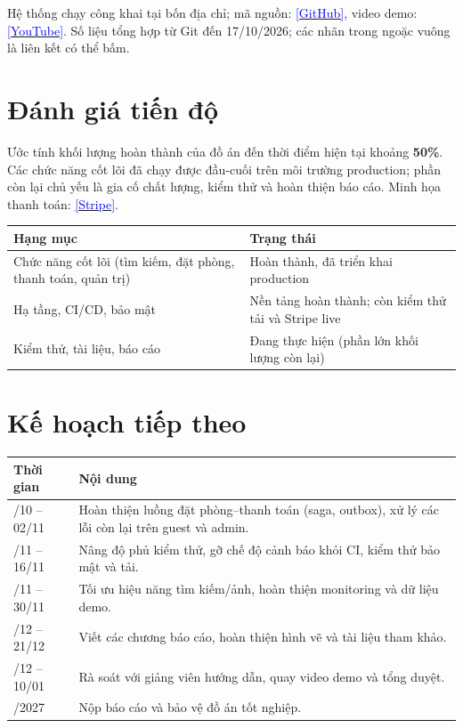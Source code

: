 \documentclass[12pt,a4paper]{article}
\newcommand{\gh}{https://github.com/bk-leducphuong/TravelNest-Hotel_Booking_System/blob/master}
\newcommand{\link}[2]{\href{#1}{\textcolor{blue}{\footnotesize[#2]}}}
\begin{document}
\noindent Hệ thống chạy công khai tại bốn địa chỉ; mã nguồn: \link{https://github.com/bk-leducphuong/TravelNest-Hotel_Booking_System}{GitHub}, video demo: \link{https://www.youtube.com/watch?v=-jxhmIJp988\&list=PLCt2C1YyUqcCfEhqOXE-Mul8UINudlCse}{YouTube}. Số liệu tổng hợp từ Git đến 17/10/2026; các nhãn trong ngoặc vuông là liên kết có thể bấm.

\section{Đánh giá tiến độ}

Ước tính khối lượng hoàn thành của đồ án đến thời điểm hiện tại khoảng \textbf{50\%}. Các chức năng cốt lõi đã chạy được đầu-cuối trên môi trường production; phần còn lại chủ yếu là gia cố chất lượng, kiểm thử và hoàn thiện báo cáo. Minh họa thanh toán: \link{\gh/docs/reports/images/ui_stripe_dashboard.png}{Stripe}.

\begin{center}
\small
\begin{tabularx}{\textwidth}{@{}>{\raggedright\arraybackslash}p{7.0cm}X@{}}
\toprule
\textbf{Hạng mục} & \textbf{Trạng thái} \\
\midrule
Chức năng cốt lõi (tìm kiếm, đặt phòng, thanh toán, quản trị) & Hoàn thành, đã triển khai production \\
Hạ tầng, CI/CD, bảo mật & Nền tảng hoàn thành; còn kiểm thử tải và Stripe live \\
Kiểm thử, tài liệu, báo cáo & Đang thực hiện (phần lớn khối lượng còn lại) \\
\bottomrule
\end{tabularx}
\end{center}

\section{Kế hoạch tiếp theo}

\begin{center}
\small
\begin{tabularx}{\textwidth}{@{}>{\raggedright\arraybackslash}p{3.0cm}X@{}}
\toprule
\textbf{Thời gian} & \textbf{Nội dung} \\
\midrule
20/10 -- 02/11 & Hoàn thiện luồng đặt phòng--thanh toán (saga, outbox), xử lý các lỗi còn lại trên guest và admin. \\
03/11 -- 16/11 & Nâng độ phủ kiểm thử, gỡ chế độ cảnh báo khỏi CI, kiểm thử bảo mật và tải. \\
17/11 -- 30/11 & Tối ưu hiệu năng tìm kiếm/ảnh, hoàn thiện monitoring và dữ liệu demo. \\
01/12 -- 21/12 & Viết các chương báo cáo, hoàn thiện hình vẽ và tài liệu tham khảo. \\
22/12 -- 10/01 & Rà soát với giảng viên hướng dẫn, quay video demo và tổng duyệt. \\
01/2027 & Nộp báo cáo và bảo vệ đồ án tốt nghiệp. \\
\bottomrule
\end{tabularx}
\end{center}
\end{document}
